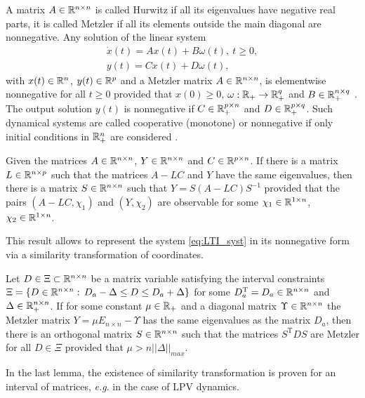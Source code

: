 A matrix $A\in\mathbb{R}^{n\times n}$ is called Hurwitz if all its eigenvalues have negative real parts, it is called Metzler if all its elements outside the main diagonal are nonnegative. Any solution of the linear system
\begin{gather}
\dot{x}(t)=Ax(t)+B\omega(t),\:t\geq0,\label{eq:LTI_syst}\\
y(t)=Cx(t)+D\omega(t),\nonumber 
\end{gather}
with $x(t)\in\mathbb{R}^{n}$, $y(t)\in\mathbb{R}^{p}$ and a Metzler matrix $A\in\mathbb{R}^{n\times n}$, is elementwise nonnegative for all $t\ge0$ provided that $x(0)\ge0$, $\omega:\mathbb{R}_{+}\to\mathbb{R}_{+}^{q}$ and $B\in\mathbb{R}_{+}^{n\times q}$ \citep{FarinaRinaldi2000,Smith95}. The output solution $y(t)$ is nonnegative if $C\in\mathbb{R}_{+}^{p\times n}$ and $D\in\mathbb{R}_{+}^{p\times q}$. Such dynamical systems are called cooperative (monotone) or nonnegative if only initial conditions in $\mathbb{R}_{+}^{n}$ are considered \citep{FarinaRinaldi2000,Smith95}.
\begin{lemma}
	\label{lem:l2}
	\begin{leftbar}[lemmabar]
	Given the matrices $A\in\mathbb{R}^{n\times n}$, $Y\in\mathbb{R}^{n\times n}$ and \textup{$C\in\mathbb{R}^{p\times n}$. }If there is a matrix \textup{$L\in\mathbb{R}^{n\times p}$} such that the matrices $A-LC$ and $Y$ have the same eigenvalues, then there is a matrix $S\in\mathbb{R}^{n\times n}$ such that $Y=S(A-LC)S^{-1}$ provided that the pairs $(A-LC,\chi_{1})$ and $(Y,\chi_{2})$ are observable for some $\chi_{1}\in\mathbb{R}^{1\times n}$, $\chi_{2}\in\mathbb{R}^{1\times n}$.
	\end{leftbar}
\end{lemma}
This result allows to represent the system \eqref{eq:LTI_syst} in its nonnegative form via a similarity transformation of coordinates.
\begin{lemma}
	\label{lem:l3}
	\begin{leftbar}[lemmabar]
	Let $D\in\Xi\subset\mathbb{R}^{n\times n}$ be a matrix variable satisfying the interval constraints $\Xi=\{D\in\mathbb{R}^{n\times n}:\,D_{a}-\Delta\le D\le D_{a}+\Delta\}$ for some $D_{a}^{\text{T}}=D_{a}\in\mathbb{R}^{n\times n}$ and $\Delta\in\mathbb{R}_{+}^{n\times n}$. If for some constant $\mu\in\mathbb{R}_{+}$ and a diagonal matrix $\Upsilon\in\mathbb{R}^{n\times n}$ the Metzler matrix $Y=\mu E_{n\times n}-\Upsilon$ has the same eigenvalues as the matrix $D_{a}$, then there is an orthogonal matrix $S\in\mathbb{R}^{n\times n}$ such that the matrices $S^{\text{T}}DS$ are Metzler for all $D\in\Xi$ provided that $\mu>n||\Delta||_{max}$.\textup{ }
	\end{leftbar}
\end{lemma}
In the last lemma, the existence of similarity transformation is proven for an interval of matrices, \emph{e.g}. in the case of LPV dynamics.

